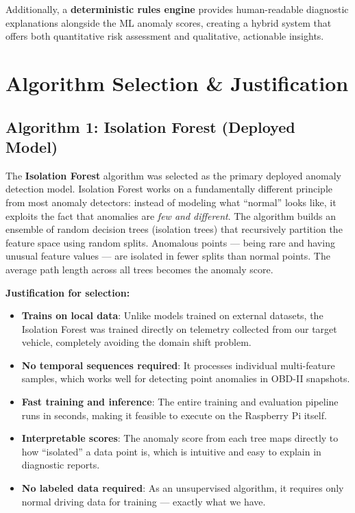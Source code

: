 Additionally, a \textbf{deterministic rules engine} provides human-readable diagnostic explanations alongside the ML anomaly scores, creating a hybrid system that offers both quantitative risk assessment and qualitative, actionable insights.


\section{Algorithm Selection \& Justification}

\subsection{Algorithm 1: Isolation Forest (Deployed Model)}

The \textbf{Isolation Forest} algorithm was selected as the primary deployed anomaly detection model. Isolation Forest works on a fundamentally different principle from most anomaly detectors: instead of modeling what ``normal'' looks like, it exploits the fact that anomalies are \textit{few and different}. The algorithm builds an ensemble of random decision trees (isolation trees) that recursively partition the feature space using random splits. Anomalous points --- being rare and having unusual feature values --- are isolated in fewer splits than normal points. The average path length across all trees becomes the anomaly score.

\textbf{Justification for selection:}
\begin{itemize}
    \item \textbf{Trains on local data}: Unlike models trained on external datasets, the Isolation Forest was trained directly on telemetry collected from our target vehicle, completely avoiding the domain shift problem.
    \item \textbf{No temporal sequences required}: It processes individual multi-feature samples, which works well for detecting point anomalies in OBD-II snapshots.
    \item \textbf{Fast training and inference}: The entire training and evaluation pipeline runs in seconds, making it feasible to execute on the Raspberry Pi itself.
    \item \textbf{Interpretable scores}: The anomaly score from each tree maps directly to how ``isolated'' a data point is, which is intuitive and easy to explain in diagnostic reports.
    \item \textbf{No labeled data required}: As an unsupervised algorithm, it requires only normal driving data for training --- exactly what we have.
\end{itemize}

